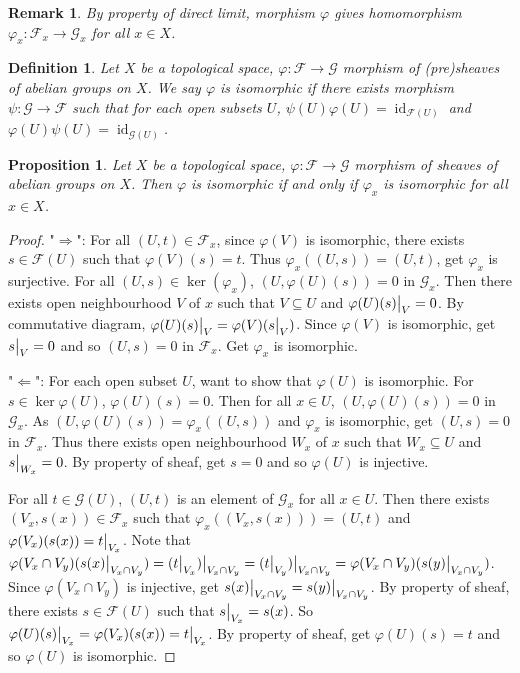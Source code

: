 \documentclass{ctexart}
\newtheorem{definition}{Definition}[section]
\newtheorem{remark}{Remark}[section]
\newtheorem{proposition}{Proposition}[section]
\newcommand{\identity}{\operatorname{id}}
\begin{document}
\begin{remark}
    By property of direct limit, morphism $\varphi$ gives homomorphism $\varphi_{x}: \mathcal{F}_{x} \longrightarrow \mathcal{G}_{x}$ for all $x\in X$.
\end{remark}
\begin{definition}
    Let $X$ be a topological space, $\varphi: \mathcal{F} \longrightarrow \mathcal{G}$ morphism of (pre)sheaves of abelian groups on $X$.
    We say $\varphi$ is isomorphic if there exists morphism $\psi: \mathcal{G} \longrightarrow \mathcal{F}$ such that for each open subsets $U$, 
    $\psi(U)\varphi(U) = \identity_{\mathcal{F}(U)}$ and $\varphi(U)\psi(U) = \identity_{\mathcal{G}(U)}$.
\end{definition}
\begin{proposition}
    Let $X$ be a topological space, $\varphi: \mathcal{F} \longrightarrow \mathcal{G}$ morphism of sheaves of abelian groups on $X$.
    Then $\varphi$ is isomorphic if and only if $\varphi_{x}$ is isomorphic for all $x\in X$.
    \label{Proposition 1.6}
\end{proposition}
\begin{proof}
    "$\Rightarrow$": For all $(U, t)\in \mathcal{F}_{x}$, since $\varphi(V)$ is isomorphic,
    there exists $s\in \mathcal{F}(U)$ such that $\varphi(V)(s) = t$.
    Thus $\varphi_{x}((U, s)) = (U, t)$, get $\varphi_{x}$ is surjective.
    For all $(U, s)\in \ker(\varphi_{x})$, $(U, \varphi(U)(s)) = 0$ in $\mathcal{G}_{x}$.
    Then there exists open neighbourhood $V$ of $x$ such that $V \subseteq U$ and $\varphi(U)(s)\big{|}_{V} = 0$.
    By commutative diagram, $\varphi(U)(s)\big{|}_{V} = \varphi(V)(s\big{|}_{V})$.
    Since $\varphi(V)$ is isomorphic, get $s\big{|}_{V} = 0$ and so $(U, s) = 0$ in $\mathcal{F}_{x}$.
    Get $\varphi_{x}$ is isomorphic.
    \par
    "$\Leftarrow$": For each open subset $U$, want to show that $\varphi(U)$ is isomorphic.
    For $s\in \ker{\varphi(U)}$, $\varphi(U)(s) = 0$.
    Then for all $x\in U$, $(U, \varphi(U)(s)) = 0$ in $\mathcal{G}_{x}$.
    As $(U, \varphi(U)(s)) = \varphi_{x}((U, s))$ and $\varphi_{x}$ is isomorphic, get $(U, s) = 0$ in $\mathcal{F}_{x}$.
    Thus there exists open neighbourhood $W_{x}$ of $x$ such that $W_{x} \subseteq U$ and $s\big{|}_{W_{x}} = 0$.
    By property of sheaf, get $s = 0$ and so $\varphi(U)$ is injective.
    \par
    For all $t\in \mathcal{G}(U)$, $(U, t)$ is an element of $\mathcal{G}_{x}$ for all $x\in U$.
    Then there exists $(V_{x}, s(x))\in \mathcal{F}_{x}$ such that $\varphi_{x}((V_{x}, s(x))) = (U, t)$ and $\varphi(V_{x})(s(x)) = t\big{|}_{V_{x}}$.
    Note that $\varphi(V_{x} \cap V_{y})(s(x)\big{|}_{V_{x} \cap V_{y}}) = (t\big{|}_{V_{x}})\big{|}_{V_{x} \cap V_{y}} = (t\big{|}_{V_{y}})\big{|}_{V_{x} \cap V_{y}} = \varphi(V_{x} \cap V_{y})(s(y)\big{|}_{V_{x} \cap V_{y}})$.
    Since $\varphi(V_{x} \cap V_{y})$ is injective, get $s(x)\big{|}_{V_{x} \cap V_{y}} = s(y)\big{|}_{V_{x} \cap V_{y}}$.
    By property of sheaf, there exists $s\in \mathcal{F}(U)$ such that $s\big{|}_{V_{x}} = s(x)$.
    So $\varphi(U)(s)\big{|}_{V_{x}} = \varphi(V_{x})(s(x)) = t\big{|}_{V_{x}}$.
    By property of sheaf, get $\varphi(U)(s) = t$ and so $\varphi(U)$ is isomorphic.
\end{proof}
\end{document}

